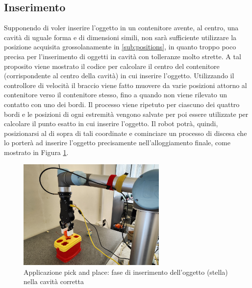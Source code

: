 \subsection{Inserimento} \label{sub:insertion}
Supponendo di voler inserire l'oggetto in un contenitore avente, al centro, una cavit\`{a} di uguale forma e di dimensioni simili, 
non sar\`{a} sufficiente utilizzare la posizione acquisita grossolanamente in \ref{sub:positions}, in quanto troppo poco precisa 
per l'inserimento di oggetti in cavit\`{a} con tolleranze molto strette. 
A tal proposito viene mostrato il codice per calcolare il centro del contenitore (corrispondente al 
centro della cavit\`{a}) in cui inserire l'oggetto\footnotemark{}. Utilizzando il controllore di velocit\`{a} il braccio viene fatto 
muovere da varie posizioni attorno al contenitore verso il contenitore stesso, fino a quando non viene rilevato un contatto con uno 
dei bordi. Il processo viene ripetuto per ciascuno dei quattro bordi e le posizioni di ogni estremit\`{a} vengono salvate per poi essere
utilizzate per calcolare il punto esatto in cui inserire l'oggetto. Il robot potr\`{a}, quindi, posizionarsi al di sopra di 
tali coordinate e cominciare un processo di discesa che lo porter\`{a} ad inserire l'oggetto precisamente nell'alloggiamento finale, 
come mostrato in Figura \ref{fig:insertion}. 
\newpage
\begin{figure}[H]
    \centering
    \includegraphics*[width=0.65\textwidth]{images/insertion.jpg}
    \caption{Applicazione pick and place: fase di inserimento dell'oggetto (stella) nella cavità corretta}
    \label{fig:insertion}
\end{figure}
